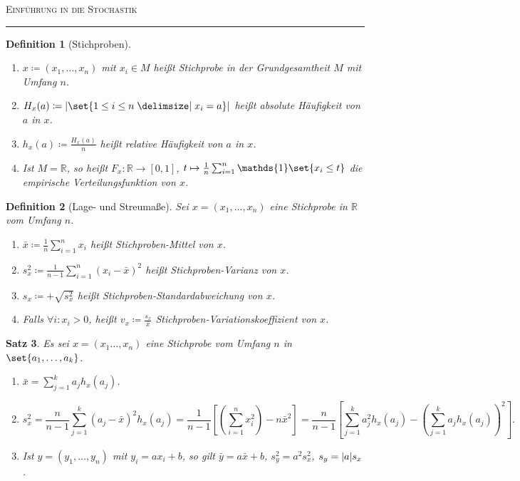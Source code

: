 \documentclass[a4paper]{article}
\newcounter{Sec}
\theoremstyle{marginbreak}
\newtheorem{definition}{Definition}[Sec]
\newtheorem{satz}[definition]{Satz}
\newcommand{\sep}{%
	\rule{\textwidth}{0.3pt}%
	\stepcounter{Sec}%
	}
\newcommand{\mean}{\bar}
\newcommand{\R}{\mathbb{R}}
\begin{document}
	\textsc{Einführung in die Stochastik}

	\sep
	\begin{definition}[Stichproben]
		\begin{enumerate}[label=(\alph*)]
			\item $x\coloneqq(x_1,\ldots,x_n)$ mit $x_i\in M$ heißt Stichprobe in der
				Grundgesamtheit $M$ mit Umfang $n$.
			\item $H_x(a)\coloneqq\abs{\set{1\leq i\leq n\given x_i=a}}$ heißt absolute Häufigkeit von $a$ in $x$.
			\item $h_x(a)\coloneqq\frac{H_x(a)}{n}$ heißt relative Häufigkeit von $a$ in $x$.
			\item Ist $M=\R$, so heißt $F_x\colon\R\to[0, 1]$,
				$t\mapsto \frac{1}{n}\sum_{i=1}^n\mathds{1}\set{x_i\leq t}$ die empirische Verteilungsfunktion von $x$.
		\end{enumerate}
	\end{definition}
	\begin{definition}[Lage- und Streumaße]
		Sei $x=(x_1,\ldots, x_n)$ eine Stichprobe in $\R$ vom Umfang $n$.
		\begin{enumerate}[label=(\alph*)]
			\item $\mean{x}\coloneqq\frac{1}{n}\sum_{i=1}^nx_i$ heißt Stichproben-Mittel von $x$.
			\item $s_x^2\coloneqq\frac{1}{n-1}\sum_{i=1}^n(x_i-\mean{x})^2$ heißt Stichproben-Varianz von $x$.
			\item $s_x\coloneqq +\sqrt{s_x^2}$ heißt Stichproben-Standardabweichung von $x$.
			\item Falls $\forall i:x_i>0$, heißt $v_x\coloneqq\frac{s_x}{\mean{x}}$ Stichproben-Variationskoeffizient von $x$.
		\end{enumerate}
	\end{definition}
	\begin{satz}
		Es sei $x=(x_1\ldots,x_n)$ eine Stichprobe vom Umfang $n$ in $\set{a_1,\ldots,a_k}$.
		\begin{enumerate}[label=(\alph*)]
			\item $\mean{x}=\sum_{j=1}^k a_jh_x(a_j)$.
			\item
				\begin{equation*}
					s_x^2 = \frac{n}{n-1}\sum_{j=1}^k (a_j-\mean{x})^2 h_x(a_j)
					= \frac{1}{n-1}\left[\left(\sum_{i=1}^nx_i^2\right) - n\mean{x}^2\right]
					= \frac{n}{n-1}\left[\sum_{j=1}^ka_j^2h_x(a_j)-\left(\sum_{j=1}^ka_jh_x(a_j)\right)^2\right].
				\end{equation*}
			\item Ist $y=(y_1,\ldots,y_n)$ mit $y_i = ax_i+b$, so gilt $\mean{y}=a\mean{x}+b$, $s_y^2 = a^2s_x^2$,
				$s_y=\abs{a}s_x$.
		\end{enumerate}
	\end{satz}
\end{document}

